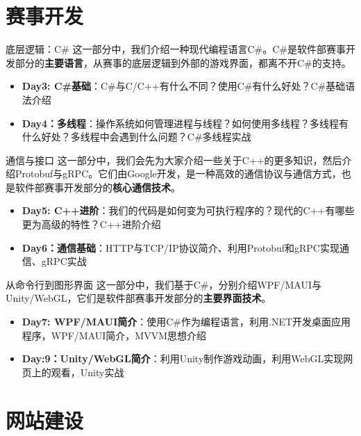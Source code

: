 \documentclass{beamer}
\begin{document}
    \section{赛事开发}

    \begin{frame}{底层逻辑：C\#}
        这一部分中，我们介绍一种现代编程语言C\#。C\#是软件部赛事开发部分的\textbf{主要语言}，从赛事的底层逻辑到外部的游戏界面，都离不开C\#的支持。
        \begin{itemize}
            \item \textbf{Day3: C\#基础}：C\#与C/C++有什么不同？使用C\#有什么好处？C\#基础语法介绍
            \item \textbf{Day4：多线程}：操作系统如何管理进程与线程？如何使用多线程？多线程有什么好处？多线程中会遇到什么问题？C\#多线程实战
        \end{itemize}
    \end{frame}

    \begin{frame}{通信与接口}
        这一部分中，我们会先为大家介绍一些关于C++的更多知识，然后介绍Protobuf与gRPC。它们由Google开发，是一种高效的通信协议与通信方式，也是软件部赛事开发部分的\textbf{核心通信技术}。
        \begin{itemize}
            \item \textbf{Day5: C++进阶}：我们的代码是如何变为可执行程序的？现代的C++有哪些更为高级的特性？C++进阶介绍
            \item \textbf{Day6：通信基础}：HTTP与TCP/IP协议简介、利用Protobuf和gRPC实现通信、gRPC实战
        \end{itemize}
    \end{frame}

    \begin{frame}{从命令行到图形界面}
        这一部分中，我们基于C\#，分别介绍WPF/MAUI与Unity/WebGL，它们是软件部赛事开发部分的\textbf{主要界面技术}。
        \begin{itemize}
            \item \textbf{Day7: WPF/MAUI简介}：使用C\#作为编程语言，利用.NET开发桌面应用程序，WPF/MAUI简介，MVVM思想介绍
            \item \textbf{Day:9：Unity/WebGL简介}：利用Unity制作游戏动画，利用WebGL实现网页上的观看，Unity实战
        \end{itemize}
    \end{frame}

    \section{网站建设}
\end{document}
